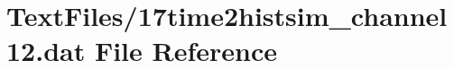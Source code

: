 \hypertarget{17time2histsim__channel12_8dat}{}\section{Text\+Files/17time2histsim\+\_\+channel12.dat File Reference}
\label{17time2histsim__channel12_8dat}
